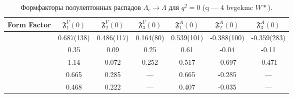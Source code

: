 \begin{table}[H]
    \centering
    \caption{Формфакторы полулептонных распадов $\Lambda_c \to \Lambda$ для $q^2 = 0$ (q --- 4 bvgekmc $W*$).}
    \begin{tabular}{|c|c|c|c|c|c|c|}
    \hline
    Form Factor & $\mathfrak{F}_1^V(0)$ & $\mathfrak{F}_2^V(0)$ & $\mathfrak{F}_3^V(0)$ & $\mathfrak{F}_1^A(0)$ & $\mathfrak{F}_2^A(0)$ & $\mathfrak{F}_3^A(0)$ \\
    \hline
    \cite{QCD2021} & 0.687(138) & 0.486(117) & 0.164(80) & 0.539(101) & -0.388(100) & -0.359(283) \\
    \hline
    \cite{BagModel1989} & 0.35 & 0.09 & 0.25 & 0.61 & -0.04 & -0.11 \\
    \hline
    \cite{RQM2016} & 1.14 & 0.072 & 0.252 & 0.517 & -0.697 & -0.471 \\
    \hline
    \cite{QSR2009} & 0.665 & 0.285 & --- & 0.665 & -0.285 & --- \\
    \hline
    \cite{LFCQM2018} & 0.468 & 0.222 & --- & 0.407 & -0.035 & --- \\
    \hline
    \end{tabular}
\end{table}

    
    
